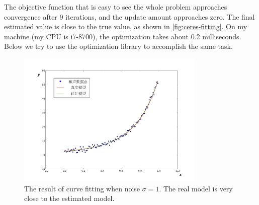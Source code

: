The objective function that is easy to see the whole problem approaches convergence after 9 iterations, and the update amount approaches zero. The final estimated value is close to the true value, as shown in \autoref{fig:ceres-fitting}. On my machine (my CPU is i7-8700), the optimization takes about 0.2 milliseconds. Below we try to use the optimization library to accomplish the same task.

\begin{figure}[!ht]
	\centering
	\includegraphics[width=0.8\textwidth]{chapter06/optimization/ceresFitting.pdf}
	\caption{The result of curve fitting when noise $\sigma=1$. The real model is very close to the estimated model. }
	\label{fig:ceres-fitting}
\end{figure}
